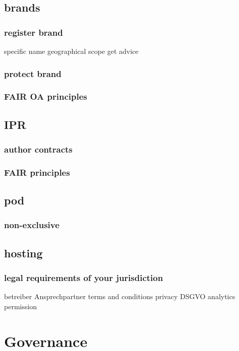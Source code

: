 \documentclass[output=guidelines,guidelines] {langscibook}
\begin{document}
\subsection{brands}
\subsubsection{register brand}
                    specific name
                    geographical scope
                    get advice
\subsubsection{protect brand}
\subsubsection{FAIR OA principles}
\subsection{IPR}
\subsubsection{author contracts}
\subsubsection{FAIR principles}
\subsection{pod}
\subsubsection{non-exclusive}
\subsection{hosting}
\subsubsection{legal requirements of your jurisdiction}
                    betreiber
                    Ansprechpartner
                    terms and conditions
                    privacy
                        DSGVO
                        analytics
                        permission
\section{Governance}
\end{document}
